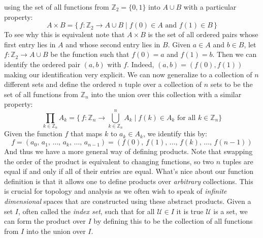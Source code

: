         using the set of all functions from $\mathbb{Z}_{2}=\{0,1\}$ into
        $A\cup{B}$ with a particular property:
        \begin{equation}
            A\times{B}=
            \big\{\,f:\mathbb{Z}_{2}\rightarrow{A}\cup{B}\;|\;
                f(0)\in{A}\textrm{ and }f(1)\in{B}\,\big\}
        \end{equation}
        To see why this is equivalent note that $A\times{B}$ is the set of all
        ordered pairs whose first entry lies in $A$ and whose second entry lies
        in $B$. Given $a\in{A}$ and $b\in{B}$, let
        $f:\mathbb{Z}_{2}\rightarrow{A}\cup{B}$ be the function such that
        $f(0)=a$ and $f(1)=b$. Then we can identify the ordered pair $(a,b)$
        with $f$. Indeed, $(a,b)=(f(0),f(1))$ making our identification very
        explicit. We can now generalize to a collection of $n$ different sets
        and define the ordered $n$ tuple over a collection of $n$ sets to be the
        set of all functions from $\mathbb{Z}_{n}$ into the union over this
        collection with a similar property:
        \begin{equation}
            \prod_{k\in\mathbb{Z}_{n}}A_{k}
            =\Big\{\,f:\mathbb{Z}_{n}\rightarrow\bigcup_{k\in\mathbb{Z}_{n}}^{n}
                A_{k}\;\big|\;f(k)\in{A}_{k}\textrm{ for all }k\in\mathbb{Z}_{n}
            \Big\}
        \end{equation}
        Given the function $f$ that maps $k$ to $a_{k}\in{A}_{k}$, we identify
        this by:
        \begin{equation}
            f=(a_{0},\,a_{1},\,\dots,\,a_{k},\,\dots,\,a_{n-1})
            =(f(0),\,f(1),\,\dots,\,f(k),\,\dots,\,f(n-1))
        \end{equation}
        And thus we have a more general way of defining products. Note that
        swapping the order of the product is equivalent to changing functions,
        so two $n$ tuples are equal if and only if all of their entries are
        equal. What's nice about our function definition is that it allows one
        to define products over \textit{arbitrary} collections. This is crucial
        for topology and analysis as we often wish to speak of
        \textit{infinite dimensional} spaces that are constructed using these
        abstract products. Given a set $I$, often called the \textit{index set},
        such that for all $\mathcal{U}\in{I}$ it is true $\mathcal{U}$ is a set,
        we can form the product over $I$ by defining this to be the collection
        of all functions from $I$ into the union over $I$.

